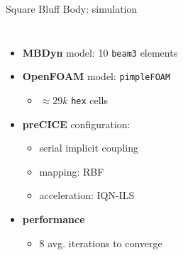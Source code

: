 \documentclass[10pt,t]{beamer}
\begin{document}
\begin{frame}{Square Bluff Body: simulation}
\begin{columns}
\footnotesize
\begin{itemize}
    \item \textbf{MBDyn} model: 10 \texttt{beam3} elements
    \item \textbf{OpenFOAM} model: \texttt{pimpleFOAM}
    \begin{itemize}
        \item $\approx 29k$ \texttt{hex} cells
    \end{itemize}
    \item \textbf{preCICE} configuration:
    \begin{itemize}
        \item serial implicit coupling
        \item mapping: RBF
        \item acceleration: IQN-ILS
    \end{itemize}
    \item \textbf{performance}
    \begin{itemize}
        \item 8 avg. iterations to converge
    \end{itemize}

\end{itemize}

\end{columns}

\end{frame}
\end{document}
